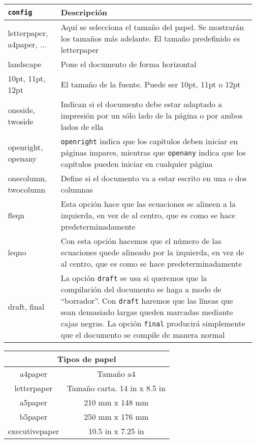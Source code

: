 	\begin{center}
		\begin{longtable}[c]{|p{100pt}|p{330pt}|}
			\hline
			\texttt{config} & Descripción\\
			\hline
			letterpaper, a4paper, ... & Aquí se selecciona el tamaño del papel. Se mostrarán los tamaños más adelante. El tamaño predefinido es letterpaper\\
			\hline
			landscape & Pone el documento de forma horizontal\\
			\hline
			10pt, 11pt, 12pt & El tamaño de la fuente. Puede ser 10pt, 11pt o 12pt\\
			\hline
			oneside, twoside & Indican si el documento debe estar adaptado a impresión por un sólo lado de la página o por ambos lados de ella\\
			\hline
			openright, openany & \texttt{openright} indica que los capítulos deben iniciar en páginas impares, mientras que \texttt{openany} indica que los capítulos pueden iniciar en cualquier página\\
			\hline
			onecolumn, twocolumn & Define si el documento va a estar escrito en una o dos columnas\\
			\hline
			fleqn & Esta opción hace que las ecuaciones se alineen a la izquierda, en vez de al centro, que es como se hace predeterminadamente\\
			\hline
			leqno & Con esta opción hacemos que el número de las ecuaciones quede alineado por la izquierda, en vez de al centro, que es como se hace predeterminadamente\\
			\hline
			draft, final & 	La opción \texttt{draft} se usa si queremos que la compilación del documento se haga a modo de ``borrador''. Con \texttt{draft} haremos que las líneas que sean demasiado largas queden marcadas mediante cajas negras. La opción \texttt{final} producirá simplemente que el documento se compile de manera normal\\
			\hline
		\end{longtable}
	\end{center} 
		
	\begin{longtable}{|c|c|}
		\hline
		\multicolumn{2}{|c|}{Tipos de papel}\\
		\hline
		a4paper & Tamaño a4\\
		\hline
		letterpaper & Tamaño carta. 14 in x 8.5 in\\
		\hline
		a5paper & 210 mm x 148 mm\\
		\hline
		b5paper & 250 mm x 176 mm\\
		\hline
		executivepaper & 10.5 in x 7.25 in\\
		\hline
	\end{longtable}
	

